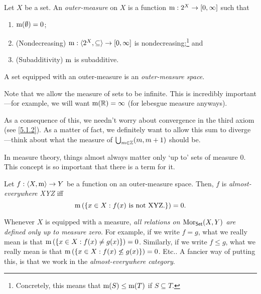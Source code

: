 \begin{dfn}\label{OuterMeasure}
Let $X$ be a set.  An \emph{outer-measure} on $X$ is a function $\mathrm{m} :2^X\rightarrow [0,\infty ]$ such that
\begin{enumerate}
\item $\mathrm{m} (\emptyset )=0$;
\item (Nondecreasing)\label{Measure.Monotonicity} $\mathrm{m} :\langle2^X,\subseteq\rangle\rightarrow [0,\infty ]$ is nondecreasing;\footnote{Concretely, this means that $\mathrm{m} (S)\leq \mathrm{m} (T)$ if $S\subseteq T$.} and
\item (Subadditivity) $\mathrm{m}$ is subadditive.
\end{enumerate}
A set equipped with an outer-measure is an \emph{outer-measure space}.
\begin{rmk}
Note that we allow the measure of sets to be infinite.  This is incredibly important---for example, we will want $\mathrm{m} (\mathbb{R} )=\infty$ (for lebesgue measure anyways).
\end{rmk}
\begin{rmk}
As a consequence of this, we needn't worry about convergence in the third axiom (see \eqref{5.1.2}).  As a matter of fact, we definitely want to allow this sum to diverge---think about what the measure of $\bigcup _{m\in \mathbb{Z}}(m,m+1)$ should be.
\end{rmk}
\end{dfn}
In measure theory, things almost always matter only `up to' sets of measure $0$.  This concept is so important that there is a term for it.
\begin{mdf}\label{AlmostEverywhereXYZ}
Let $f:\langle X,\mathrm{m}\rangle\rightarrow Y$ be a function on an outer-measure space.  Then, $f$ is \emph{almost-everywhere XYZ} iff
\begin{equation}
\mathrm{m} \left( \left\{ x\in X:f(x)\text{ is not XYZ.}\right\} \right) =0.
\end{equation}
\end{mdf}
\begin{displayquote}
Whenever $X$ is equipped with a measure, \emph{all relations on $\operatorname{Mor} _{\mathsf{Set}}(X,Y)$ are defined only up to measure zero}.  For example, if we write $f=g$, what we really mean is that $\mathrm{m} \left( \{ x\in X:f(x)\neq g(x)\} \right) =0$.  Similarly, if we write $f\leq g$, what we really mean is that $\mathrm{m} \left( \{ x\in X:f(x)\not \leq g(x)\} \right) =0$.  Etc..  A fancier way of putting this, is that we work in the \emph{almost-everywhere category}.
\end{displayquote}
